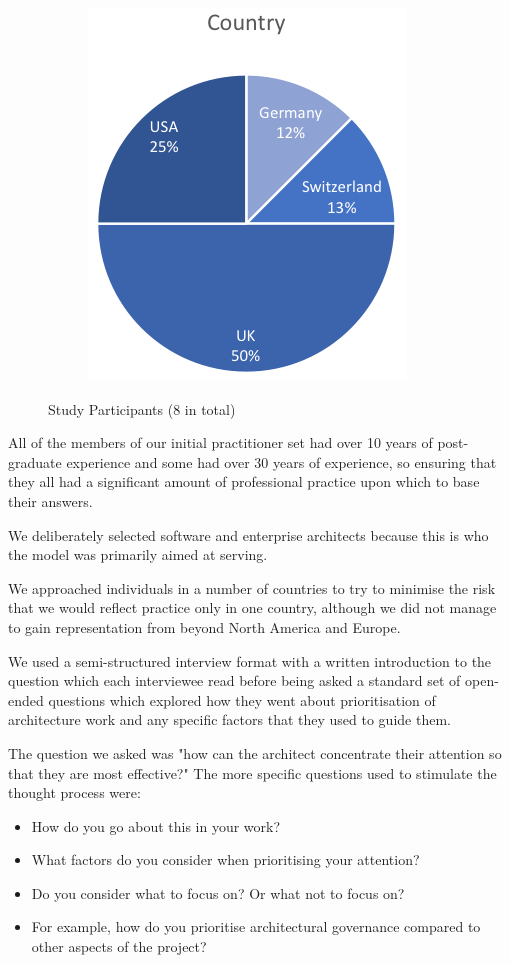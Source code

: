 \begin{figure}
\begin{subfigure}{\linewidth}
      \includegraphics[scale=1.0]{Figures/prioritisation-countries}
   \end{subfigure}

   \caption{Study Participants (8 in total)}
   \label{figure:participants}
\end{figure}  

All of the members of our initial practitioner set had over 10 years of post-graduate experience and some had over 30 years of experience, so ensuring that they all had a significant amount of professional practice upon which to base their answers.

We deliberately selected software and enterprise architects because this is who the model was primarily aimed at serving.

We approached individuals in a number of countries to try to minimise the risk that we would reflect practice only in one country, although we did not manage to gain representation from beyond North America and Europe.

We used a semi-structured interview format with a written introduction to the question which each interviewee read before being asked a standard set of open-ended questions which explored how they went about prioritisation of architecture work and any specific factors that they used to guide them.  

The question we asked was "how can the architect concentrate their attention so that they are most effective?" The more specific questions used to stimulate the thought process were: 

\begin{itemize}
	\item How do you go about this in your work? 
	\item What factors do you consider when prioritising your attention? 
	\item Do you consider what to focus on?   Or what not to focus on? 
	\item For example, how do you prioritise architectural governance compared to other aspects of the project?
\end{itemize}

